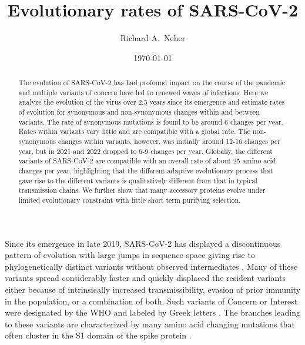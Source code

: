 \documentclass[aps,rmp, twocolumn]{revtex4}
\begin{document}
\title{Evolutionary rates of SARS-CoV-2}
\author{Richard A.~Neher}
\date{\today}

\begin{abstract}
The evolution of SARS-CoV-2 has had profound impact on the course of the pandemic and multiple variants of concern have led to renewed waves of infections.
Here we analyze the evolution of the virus over 2.5 years since its emergence and estimate rates of evolution for synonymous and non-synonymous changes within and between variants.
The rate of synonymous mutations is found to be around 6 changes per year.
Rates within variants vary little and are compatible with a global rate.
The non-synonymous changes within variants, however, was initially around 12-16 changes per year, but in 2021 and 2022 dropped to 6-9 changes per year.
Globally, the different variants of SARS-CoV-2 are compatible with an overall rate of about 25 amino acid changes per year, highlighting that the different adaptive evolutionary process that gave rise to the different variants is qualitatively different from that in typical transmission chains.
We further show that many accessory proteins evolve under limited evolutionary constraint with little short term purifying selection.
\end{abstract}

\maketitle

Since its emergence in late 2019, SARS-CoV-2 has displayed a discontinuous pattern of evolution with large jumps in sequence space giving rise to phylogenetically distinct variants without observed intermediates \citep{hodcroft_spread_2021,volz_assessing_2021,tegally_detection_2021,faria_genomics_2021,naveca_covid-19_2021,viana_rapid_2022}.
Many of these variants spread considerably faster and quickly displaced the resident variants either because of intrinsically increased transmissibility, evasion of prior immunity in the population, or a combination of both.
Such variants of Concern or Interest were designated by the WHO and labeled by Greek letters \citep{konings_sars-cov-2_2021}.
The branches leading to these variants are characterized by many amino acid changing mutations that often cluster in the S1 domain of the spike protein \citep{kistler_rapid_2022}.
\end{document}
